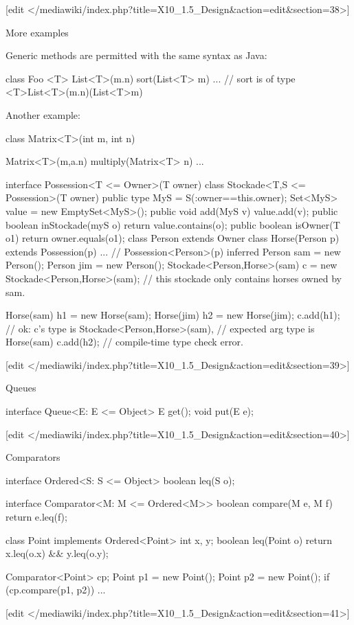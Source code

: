[edit </mediawiki/index.php?title=X10_1.5_Design&action=edit&section=38>]


      More examples

Generic methods are permitted with the same syntax as Java:

 class Foo {
  <T> List<T>(m.n) sort(List<T> m) {...} // sort is of type <T>List<T>(m.n)(List<T>m)
 }

Another example:

 class Matrix<T>(int m, int n) { 
   Matrix<T>(m,a.n) multiply(Matrix<T> n) { ...}

 interface Possession<T <= Owner>(T owner){}
 class Stockade<T,S <= Possession>(T owner) {
   public type MyS = S(:owner==this.owner);
   Set<MyS> value = new EmptySet<MyS>();
   public void add(MyS v) { value.add(v); }
   public boolean inStockade(myS o) { return value.contains(o);}
   public boolean isOwner(T o1) { return owner.equals(o1);}
 }
 class Person extends Owner {}
 class Horse(Person p) extends Possession(p) {...} // Possession<Person>(p) inferred
 Person sam = new Person();
 Person jim = new Person();
 Stockade<Person,Horse>(sam) c = 
   new Stockade<Person,Horse>(sam); // this stockade only contains horses owned by sam.
 
 Horse(sam) h1 = new Horse(sam);
 Horse(jim) h2 = new Horse(jim);
 c.add(h1); // ok: c's type is Stockade<Person,Horse>(sam), 
            // expected arg type is Horse(sam)
 c.add(h2); // compile-time type check error.

[edit </mediawiki/index.php?title=X10_1.5_Design&action=edit&section=39>]


      Queues

interface Queue<E: E <= Object> {
  E get();
  void put(E e);
}

[edit </mediawiki/index.php?title=X10_1.5_Design&action=edit&section=40>]


      Comparators

interface Ordered<S: S <= Object> {
  boolean leq(S o);
}

interface Comparator<M: M <= Ordered<M>> {
  boolean compare(M e, M f) { return e.leq(f); }
}

class Point implements Ordered<Point>
  int x, y;
  boolean leq(Point o) { return x.leq(o.x) && y.leq(o.y); }
}

Comparator<Point> cp;
Point p1 = new Point();
Point p2 = new Point();
if (cp.compare(p1, p2)) ...

[edit </mediawiki/index.php?title=X10_1.5_Design&action=edit&section=41>]


